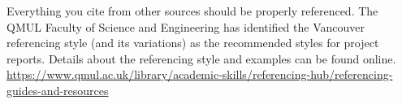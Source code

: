 \documentclass[12pt,a4paper,UTF8]{article}
\begin{document}


\tableofcontents
\thispagestyle{fancy}
\linespread{1.5} %

\newpage


\newpage


\newpage


\newpage


\newpage


\newpage


\newpage


\newpage
{}



Everything you cite from other sources should be properly referenced. The QMUL Faculty of Science and Engineering has identified the Vancouver referencing style (and its variations) as the recommended styles for project reports. Details about the referencing style and examples can be found online. \href{https://www.qmul.ac.uk/library/academic-skills/referencing-hub/referencing-guides-and-resources}{https://www.qmul.ac.uk/library/academic-skills/referencing-hub/referencing-guides-and-resources}
\end{document}
